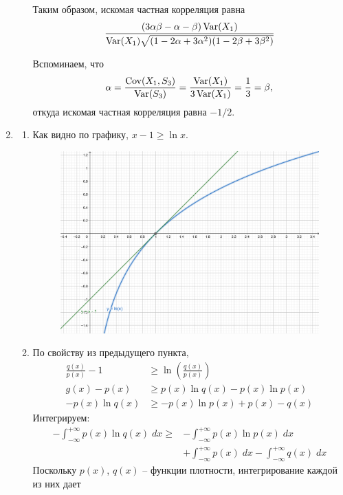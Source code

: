 \begin{enumerate}
\begin{enumerate}
Таким образом, искомая частная корреляция равна
\[
\frac{(3\alpha\beta - \alpha - \beta)\operatorname{Var}(X_1)}{\operatorname{Var}(X_1)\sqrt{(1 - 2\alpha + 3\alpha^2)(1 - 2\beta + 3\beta^2)}}
\]

Вспоминаем, что
\[
\alpha = \frac{\operatorname{Cov}(X_1,S_3)}{\operatorname{Var}(S_3)} = \frac{\operatorname{Var}(X_1)}{3\operatorname{Var}(X_1)} = \frac{1}{3} = \beta,
\]
откуда искомая частная корреляция равна $-1/2$.
\end{enumerate}
\item
\begin{enumerate}
\item Как видно по графику, $x-1\geq \ln x$.
\begin{figure}[ht!]
\begin{center}
\includegraphics[]{images/sol_kr_3_ip.png}
\end{center}
\end{figure}
\item По свойству из предыдущего пункта,
\begin{align*}
\frac{q(x)}{p(x)} - 1 &\geq \ln \left(\frac{q(x)}{p(x)}\right) \\
g(x)-p(x) &\geq p(x)\ln q(x)-p(x)\ln p(x) \\
-p(x)\ln q(x) & \geq -p(x)\ln p(x) + p(x) - q(x)
\end{align*}
Интегрируем:
\begin{align*}
-\int^{+\infty}_{-\infty}p(x)\ln q(x) \; dx \geq &-\int^{+\infty}_{-\infty}p(x)\ln p(x) \; dx \\
&+\int^{+\infty}_{-\infty}p(x) \; dx - \int^{+\infty}_{-\infty}q(x) \; dx
\end{align*}
Поскольку $p(x)$, $q(x)$ – функции плотности, интегрирование каждой из них дает

\end{enumerate}
\end{enumerate}
